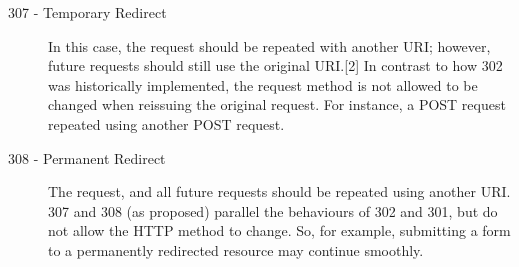 \begin{description}
	\item [307 - Temporary Redirect] In this case, the request should be repeated with another URI; however, future requests should still use the original URI.[2] In contrast to how 302 was historically implemented, the request method is not allowed to be changed when reissuing the original request. For instance, a POST request repeated using another POST request.

	\item [308 - Permanent Redirect] The request, and all future requests should be repeated using another URI. 307 and 308 (as proposed) parallel the behaviours of 302 and 301, but do not allow the HTTP method to change. So, for example, submitting a form to a permanently redirected resource may continue smoothly.
\end{description}